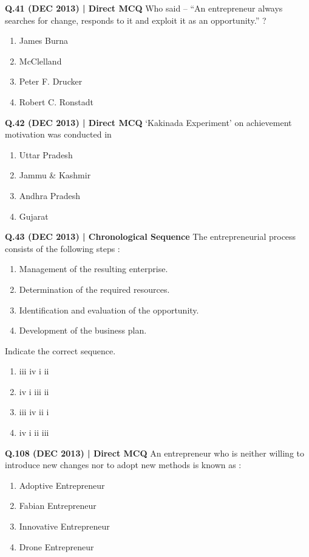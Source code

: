 \documentclass{article}
\begin{document}
\textbf{Q.41 (DEC 2013) | Direct MCQ}
Who said – “An entrepreneur always searches for change, responds to it and exploit it as an opportunity.” ?
\begin{enumerate}[label=(\arabic*)]
    \item James Burna
    \item McClelland
    \item Peter F. Drucker
    \item Robert C. Ronstadt
\end{enumerate}

\textbf{Q.42 (DEC 2013) | Direct MCQ}
‘Kakinada Experiment’ on achievement motivation was conducted in
\begin{enumerate}[label=(\arabic*)]
    \item Uttar Pradesh
    \item Jammu \& Kashmir
    \item Andhra Pradesh
    \item Gujarat
\end{enumerate}

\textbf{Q.43 (DEC 2013) | Chronological Sequence}
The entrepreneurial process consists of the following steps :
\begin{enumerate}[label=\roman*.]
    \item Management of the resulting enterprise.
    \item Determination of the required resources.
    \item Identification and evaluation of the opportunity.
    \item Development of the business plan.
\end{enumerate}
Indicate the correct sequence.
\begin{enumerate}[label=(\arabic*)]
    \item iii iv i ii
    \item iv i iii ii
    \item iii iv ii i
    \item iv i ii iii
\end{enumerate}

\textbf{Q.108 (DEC 2013) | Direct MCQ}
An entrepreneur who is neither willing to introduce new changes nor to adopt new methods is known as :
\begin{enumerate}[label=(\arabic*)]
    \item Adoptive Entrepreneur
    \item Fabian Entrepreneur
    \item Innovative Entrepreneur
    \item Drone Entrepreneur
\end{enumerate}
\end{document}
